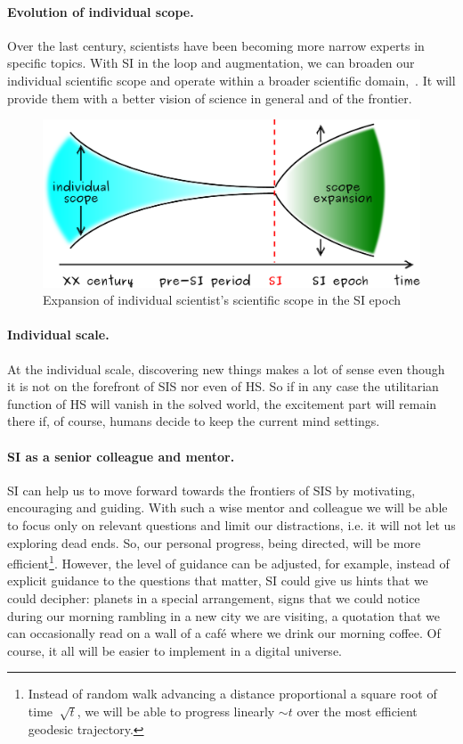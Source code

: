 \documentclass[a4paper,11pt]{article}
\begin{document}
\paragraph{Evolution of individual scope.} 
Over the last century, scientists have been becoming more narrow experts in specific topics. With SI in the loop and augmentation, we can broaden our individual scientific scope and operate within a broader scientific domain,~. It will provide them with a better vision of science in general and of the frontier.

\begin{figure}
    \includegraphics[width=1\textwidth]{scope}
    \caption{\label{fig:scope}Expansion of individual scientist's scientific scope in the SI epoch}
\end{figure}

\paragraph{Individual scale.}

At the individual scale, discovering new things makes a lot of sense even though it is not on the forefront of SIS nor even of HS. So if in any case the utilitarian function of HS will vanish in the solved world, the excitement part will remain there if, of course, humans decide to keep the current mind settings.

\paragraph{SI as a senior colleague and mentor.}

SI can help us to move forward towards the frontiers of SIS by motivating, encouraging and guiding. With such a wise mentor and colleague we will be able to focus only on relevant questions and limit our distractions, i.e. it will not let us exploring dead ends. So, our personal progress, being directed, will be more efficient\footnote{Instead of random walk advancing a distance proportional a square root of time $~\sqrt{t}$, we will be able to progress linearly $\sim t$ over the most efficient geodesic trajectory.}. However, the level of guidance can be adjusted, for example, instead of explicit guidance to the questions that matter, SI could give us hints that we could decipher: planets in a special arrangement, signs that we could notice during our morning rambling in a new city we are visiting, a quotation that we can occasionally read on a wall of a café where we drink our morning coffee. Of course, it all will be easier to implement in a digital universe.
\end{document}
